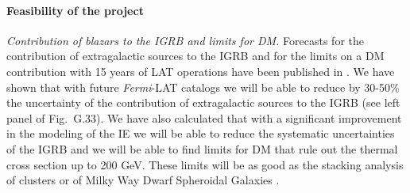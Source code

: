 \documentclass[12 pt]{article}
\newcommand{\FIXME}[1]{{\color{red}{\em Comment: }{#1}}}
\begin{document}
\vspace{-0.5cm}
\paragraph{Feasibility of the project}
{\it Contribution of blazars to the IGRB and limits for DM.}
Forecasts for the contribution of extragalactic sources to the IGRB and for the limits on a DM contribution with 15 years of LAT operations have been published in \cite{Charles:2016pgz}.
We have shown that with future {\it Fermi}-LAT catalogs we will be able to reduce by 30-50\% the uncertainty of the contribution of extragalactic sources to the IGRB (see left panel of Fig.~G.33).
We have also calculated that with a significant improvement in the modeling of the IE we will be able to reduce the systematic uncertainties of the IGRB and we will be able to find limits for DM that rule out the thermal cross section up to 200 GeV.
These limits will be as good as the stacking analysis of clusters or of Milky Way Dwarf Spheroidal Galaxies \cite{Charles:2016pgz}. 




\end{document}
